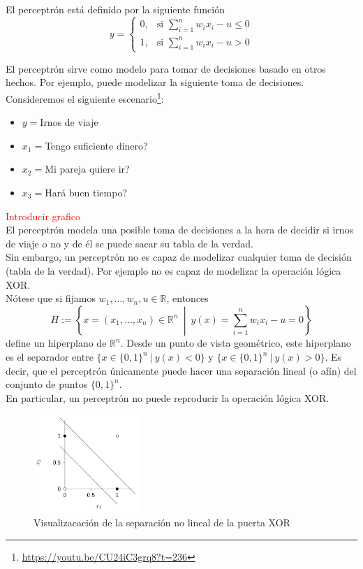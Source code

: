 \documentclass{article}
\begin{document}
El perceptrón está definido por la siguiente función
$$y=\begin{cases}
0, & \text{si } \sum_{i=1}^nw_ix_i-u\leq 0\\
1, & \text{si } \sum_{i=1}^nw_ix_i-u>0
\end{cases}$$

El perceptrón sirve como modelo para tomar de decisiones basado en otros hechos. Por ejemplo, puede modelizar la siguiente toma de decisiones. Consideremos el siguiente escenario\footnote{\url{https://youtu.be/CU24iC3grq8?t=236}}:

\begin{itemize}
\item $y=$Irnos de viaje
\item $x_1=$Tengo suficiente dinero?
\item $x_2=$Mi pareja quiere ir?
\item $x_3=$Hará buen tiempo?
\end{itemize}

\textcolor{red}{Introducir grafico}\\

El perceptrón modela una posible toma de decisiones a la hora de decidir si irnos de viaje o no y de él se puede sacar su tabla de la verdad.\\

Sin embargo, un perceptrón no es capaz de modelizar cualquier toma de decisión (tabla de la verdad). Por ejemplo no es capaz de modelizar la operación lógica XOR.\\


Nótese que si fijamos $w_1,\hdots,w_n,u\in\mathbb{R} $, entonces
$$H:=\left\{x=(x_1,\hdots,x_n)\in\mathbb{R}^n \ \middle| \ y(x)=\sum_{i=1}^nw_ix_i-u= 0\right\} $$
define un hiperplano de $\mathbb{R}^n$. Desde un punto de vista geométrico, este hiperplano es el separador entre $\{x\in\{0,1\}^n \ | \ y(x)<0\} $ y $\{x\in\{0,1\}^n \ | \ y(x)>0\} $. Es decir, que el perceptrón únicamente puede hacer una separación lineal (o afín) del conjunto de puntos $\{0,1\}^n $.\\

En particular, un perceptrón no puede reproducir la operación lógica XOR.
\begin{figure}[htbp]
\centering
\includegraphics[width=4cm]{imagenes/XOR.png}
\caption{Visualizacación de la separación no lineal de la puerta XOR}
\end{figure}
\end{document}
